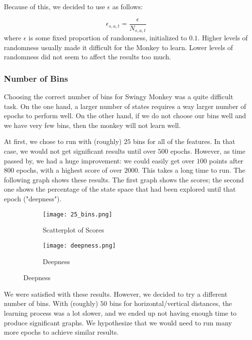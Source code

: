 \documentclass[10pt]{article}
\begin{document}
\medskip

Because of this, we decided to use $\epsilon$ as follows:

\[ \epsilon_{s,a,t} = \frac{\epsilon}{N_{s,a,t}} \]
where $\epsilon$ is some fixed proportion of randomness, initialized to $0.1$.
Higher levels of randomness usually made it difficult for the Monkey to learn.
Lower levels of randomness did not seem to affect the results too much.

\subsubsection{Number of Bins}

Choosing the correct number of bins for Swingy Monkey was a quite difficult task.
On the one hand, a larger number of states requires a way larger number of epochs to 
perform well. On the other hand, if we do not choose our bins well and we have very
few bins, then the monkey will not learn well.

\medskip

At first, we chose to run with (roughly) $25$ bins for all of the features. In that case,
we would not get significant results until over $500$ epochs. However, as time passed by,
we had a huge improvement: we could easily get over $100$ points after $800$ epochs,
with a highest score of over $2000$. This takes a long time to run. The following
graph shows these results. The first graph shows the scores; the second one
shows the percentage of the state space that had been explored until that epoch 
("deepness").

\medskip

\begin{figure}[H]
\centering
\begin{subfigure}{.5\textwidth}
  \centering
  \texttt{[image: 25\_bins.png]}
  \caption{Scatterplot of Scores}
\end{subfigure}%
\begin{subfigure}{.5\textwidth}
  \centering
  \texttt{[image: deepness.png]}
  \caption{Deepness}
\end{subfigure}
\end{figure}

\medskip

We were satisfied with these results. However, we decided to try a different number
of bins. With (roughly) $50$ bins for horizontal/vertical distances, the learning process was a lot slower,
and we ended up not having enough time to produce significant graphs. We hypothesize that
we would need to run many more epochs to achieve similar results.
\end{document}
